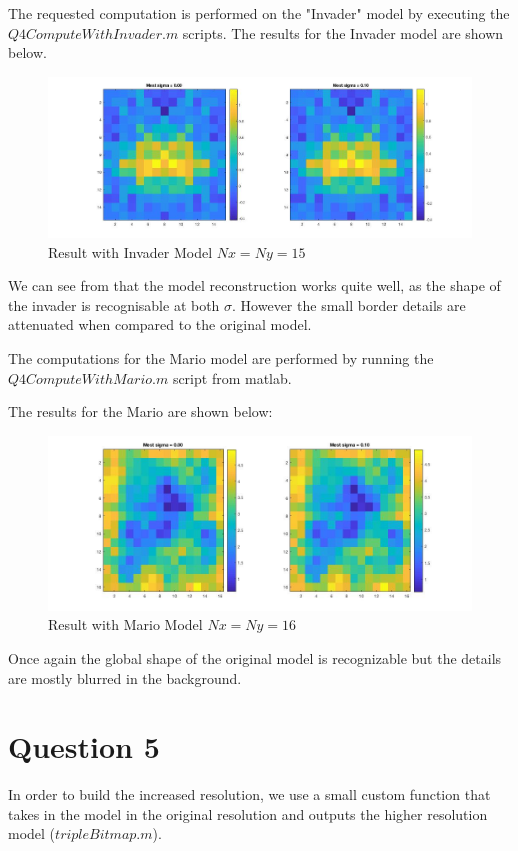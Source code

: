 \documentclass[12pt,a4paper]{extreport}
\begin{document}
The requested computation is performed on the "Invader" model by executing the $Q4ComputeWithInvader.m$ scripts.
\newpage
The results for the Invader model are shown below.

\begin{figure}[h]
\includegraphics[width=15cm]{InvaderResult.jpg} 
\caption{Result with Invader Model $Nx=Ny=15$}
\end{figure}

We can see from that the model reconstruction works quite well, as the shape of the invader is recognisable at both $\sigma$. However the small border details are attenuated when compared to the original model.

\newpage
The computations for the Mario model are performed by running the $Q4ComputeWithMario.m$ script from matlab.

The results for the Mario are shown below:
\begin{figure}[h]
\includegraphics[width=15cm]{MarioResults.jpg} 
\caption{Result with Mario Model $Nx=Ny=16$}
\end{figure}

Once again the global shape of the original model is recognizable but the details are mostly blurred in the background.
\newpage
\section{Question 5}
In order to build the increased resolution, we use a small custom function that takes in the model in the original resolution and outputs the  higher resolution model ($tripleBitmap.m$).
\end{document}
